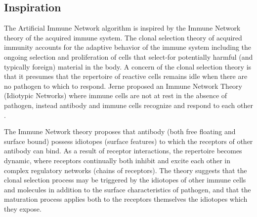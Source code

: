 \subsection{Inspiration}
The Artificial Immune Network algorithm is inspired by the Immune Network theory of the acquired immune system.
The clonal selection theory of acquired immunity accounts for the adaptive behavior of the immune system including the ongoing selection and proliferation of cells that select-for potentially harmful (and typically foreign) material in the body.
A concern of the clonal selection theory is that it presumes that the repertoire of reactive cells remains idle when there are no pathogen to which to respond. Jerne proposed an Immune Network Theory (Idiotypic Networks) where immune cells are not at rest in the absence of pathogen, instead antibody and immune cells recognize and respond to each other \cite{Jerne1974, Jerne1974a, Jerne1984}. 

The Immune Network theory proposes that antibody (both free floating and surface bound) possess idiotopes (surface features) to which the receptors of other antibody can bind. As a result of receptor interactions, the repertoire becomes dynamic, where receptors continually both inhibit and excite each other in complex regulatory networks (chains of receptors). The theory suggests that the clonal selection process may be triggered by the idiotopes of other immune cells and molecules in addition to the surface characteristics of pathogen, and that the maturation process applies both to the receptors themselves the idiotopes which they expose.

